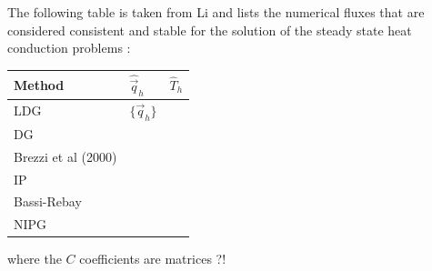 The following table is taken from Li \cite{li06} and lists the numerical fluxes 
that are considered consistent and stable for the solution of the steady state heat conduction 
problems \cite{arbc02,cacp00}:
\begin{center}
\begin{tabular}{lll}
\hline
Method & $\hat{\vec{q}}_h$ & $\hat{T}_h$ \\
\hline
LDG \cite{cosh98} & $\{ \vec{q}_h \}$  & \\
DG  \cite{cacp00} & \\
Brezzi et al (2000) \cite{brmm00} &\\
IP \cite{dodu76} & \\
Bassi-Rebay \cite{barm97} &\\
NIPG \cite{riwg99} & \\
\hline
\end{tabular}
\end{center}
where the $C$ coefficients are matrices ?!







